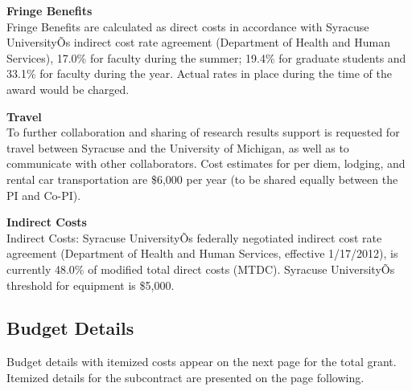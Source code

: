 \documentclass[useAMS,12pt]{article}
\begin{document}
{\bf Fringe Benefits}\\
Fringe Benefits are calculated as direct costs in accordance with Syracuse UniversityÕs indirect cost rate agreement (Department of Health and Human Services), 17.0\% for faculty during the summer; 19.4\% for graduate students and 33.1\% for faculty during the year.
Actual rates in place during the time of the award would be charged.
\smallskip

{\bf Travel}\\
To further collaboration and sharing of research results support is requested for travel between Syracuse and the University of Michigan, as well as to communicate with other collaborators. Cost estimates for per diem, lodging, and rental car transportation are \$6,000 per year (to be shared equally between the PI and Co-PI). 
\smallskip

{\bf Indirect Costs}\\
Indirect Costs: Syracuse UniversityÕs federally negotiated indirect cost rate agreement (Department of Health and Human Services, effective 1/17/2012), is currently 48.0\% of modified total direct costs (MTDC).  Syracuse UniversityÕs
threshold for equipment is \$5,000.



\subsection{Budget Details}
Budget details with itemized costs appear on the next page for the total grant. Itemized details for the subcontract are presented on the page following.
\end{document}
